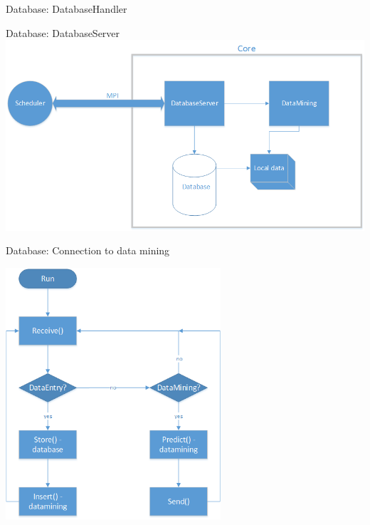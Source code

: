 \begin{frame}{Database: DatabaseHandler}
\begin{minipage}[]{.25\textwidth}
	\end{minipage}%
	
	\end{frame}
	
	\begin{frame}{Database: DatabaseServer}
	\includegraphics[width=1.0\textwidth]{images/Zeichnung6.png}
	\end{frame}
	
	\begin{frame}{Database: Connection to data mining}
	\begin{center}
	\includegraphics[height=0.64\textwidth, width=0.6\textwidth]{images/datamining_flow.png}
	\end{center}
	\end{frame}
	
